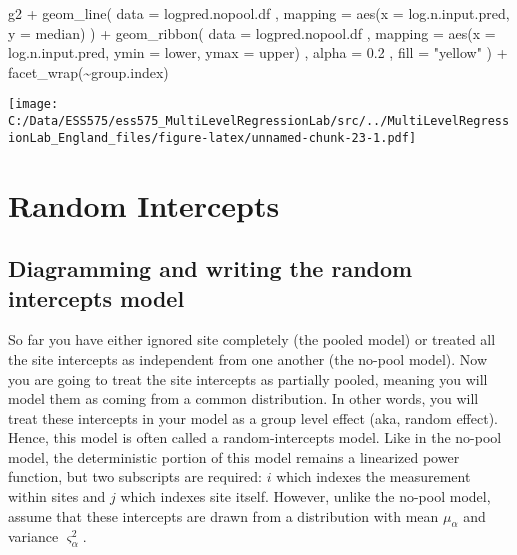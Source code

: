 \documentclass[
]{article}
\newenvironment{Shaded}{\begin{snugshade}}{\end{snugshade}}
\newcommand{\AttributeTok}[1]{\textcolor[rgb]{0.77,0.63,0.00}{#1}}
\newcommand{\FloatTok}[1]{\textcolor[rgb]{0.00,0.00,0.81}{#1}}
\newcommand{\FunctionTok}[1]{\textcolor[rgb]{0.00,0.00,0.00}{#1}}
\newcommand{\NormalTok}[1]{#1}
\newcommand{\SpecialCharTok}[1]{\textcolor[rgb]{0.00,0.00,0.00}{#1}}
\newcommand{\StringTok}[1]{\textcolor[rgb]{0.31,0.60,0.02}{#1}}
\begin{document}
\begin{Shaded}
\begin{Highlighting}[]
\NormalTok{g2 }\SpecialCharTok{+}
  \FunctionTok{geom\_line}\NormalTok{(}
    \AttributeTok{data =}\NormalTok{ logpred.nopool.df}
\NormalTok{    , }\AttributeTok{mapping =} \FunctionTok{aes}\NormalTok{(}\AttributeTok{x =}\NormalTok{ log.n.input.pred, }\AttributeTok{y =}\NormalTok{ median)}
\NormalTok{  ) }\SpecialCharTok{+}
  \FunctionTok{geom\_ribbon}\NormalTok{(}
    \AttributeTok{data =}\NormalTok{ logpred.nopool.df}
\NormalTok{    , }\AttributeTok{mapping =} \FunctionTok{aes}\NormalTok{(}\AttributeTok{x =}\NormalTok{ log.n.input.pred, }\AttributeTok{ymin =}\NormalTok{ lower, }\AttributeTok{ymax =}\NormalTok{ upper)}
\NormalTok{    , }\AttributeTok{alpha =} \FloatTok{0.2}
\NormalTok{    , }\AttributeTok{fill =} \StringTok{"yellow"}
\NormalTok{  ) }\SpecialCharTok{+}
  \FunctionTok{facet\_wrap}\NormalTok{(}\SpecialCharTok{\textasciitilde{}}\NormalTok{group.index)}
\end{Highlighting}
\end{Shaded}

\texttt{[image: C:/Data/ESS575/ess575\_MultiLevelRegressionLab/src/../MultiLevelRegressionLab\_England\_files/figure-latex/unnamed-chunk-23-1.pdf]}

\hypertarget{random-intercepts}{%
\section{Random Intercepts}\label{random-intercepts}}

\hypertarget{diagramming-and-writing-the-random-intercepts-model}{%
\subsection{Diagramming and writing the random intercepts
model}\label{diagramming-and-writing-the-random-intercepts-model}}

So far you have either ignored site completely (the pooled model) or
treated all the site intercepts as independent from one another (the
no-pool model). Now you are going to treat the site intercepts as
partially pooled, meaning you will model them as coming from a common
distribution. In other words, you will treat these intercepts in your
model as a group level effect (aka, random effect). Hence, this model is
often called a random-intercepts model. Like in the no-pool model, the
deterministic portion of this model remains a linearized power function,
but two subscripts are required: \(i\) which indexes the measurement
within sites and \(j\) which indexes site itself. However, unlike the
no-pool model, assume that these intercepts are drawn from a
distribution with mean \(\mu_{\alpha}\) and variance
\(\varsigma_{\alpha}^2\).
\end{document}
